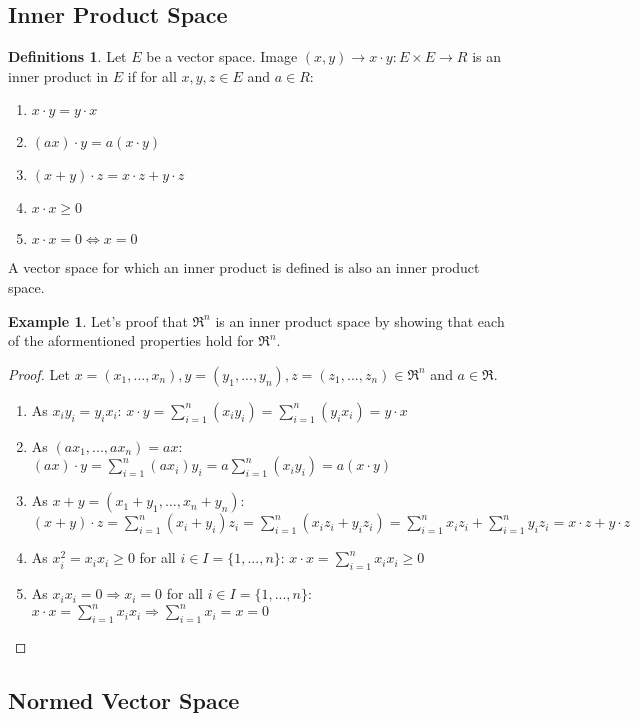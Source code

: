 \documentclass[12pt,a4paper]{article}
\theoremstyle{definition}
\newtheorem{defns}[defn]{Definitions}
\newtheorem{example}[defn]{Example}
\begin{document}
\subsection{Inner Product Space}
\begin{defns}
Let $E$ be a vector space. Image $(x, y) \rightarrow x \cdot y: E \times E
\rightarrow R$ is an inner product in $E$ if for all $x,y,z \in E$ and $a \in
R$:
\begin{enumerate}
\item $x \cdot y = y \cdot x$
\item $(ax) \cdot y = a (x \cdot y)$
\item $(x + y) \cdot z = x \cdot z + y \cdot z$
\item $x \cdot x \geq 0$
\item $x \cdot x = 0 \Leftrightarrow x = 0$
\end{enumerate}
A vector space for which an inner product is defined is also an inner product
space.
\end{defns}
\begin{example}
Let's proof that $\Re^n$ is an inner product space by showing that each of the
aformentioned properties hold for $\Re^n$.
\begin{proof}
Let $x = (x_1,...,x_n), y = (y_1,...,y_n), z = (z_1,...,z_n) \in \Re^n$ and $a
\in \Re$.
\begin{enumerate}
\item As $x_i y_i = y_i x_i$: $x \cdot y = \sum_{i = 1}^{n}(x_i y_i) = \sum_{i
= 1}^n (y_i x_i) = y \cdot x$
\item As $(a x_1,...,a x_n) = ax$: $(ax) \cdot y = \sum_{i=1}^n (a x_i) y_i = a
\sum_{i=1}^n (x_i y_i) = a (x \cdot y)$
\item As $x + y = (x_1 + y_1,...,x_n + y_n)$: $(x + y) \cdot z = \sum_{i=1}^n
(x_i + y_i) z_i = \sum_{i=1}^n (x_i z_i + y_i z_i) = \sum_{i=1}^n x_i z_i +
\sum_{i=1}^n y_i z_i = x \cdot z + y \cdot z$
\item As $x_i^2 = x_i x_i \geq 0$ for all $i \in I = \{1,...,n\}$: $x \cdot x =
\sum_{i=1}^n x_i x_i \geq 0$
\item As $x_i x_i = 0 \Rightarrow x_i = 0$ for all $i \in I = \{1,...,n\}$: $x
\cdot x = \sum_{i=1}^n x_i x_i \Rightarrow \sum_{i=1}^n x_i = x = 0$
\end{enumerate}
\end{proof}
\end{example}
\subsection{Normed Vector Space}
\end{document}
